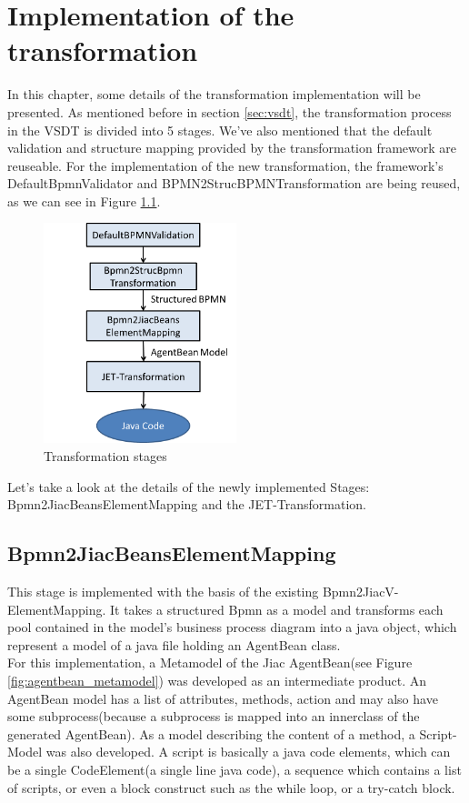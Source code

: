 \chapter{Implementation of the transformation}
\label{chap:implementation}
In this chapter, some details of the transformation implementation will be presented. As mentioned before in section \ref{sec:vsdt}, the transformation process in the VSDT is divided into 5 stages. We've also mentioned that the default validation and structure mapping provided by the transformation framework are reuseable. For the implementation of the new transformation, the framework's DefaultBpmnValidator and BPMN2StrucBPMNTransformation are being reused, as we can see in Figure \ref{fig:implementation_stages}.

\begin{figure}[h]
	\centering		\includegraphics[width=0.5\textwidth]{images/implementation_stages.png}
	\caption{Transformation stages}
	\label{fig:implementation_stages}
\end{figure}

Let's take a look at the details of the newly implemented Stages: Bpmn2JiacBeansElementMapping and the JET-Transformation.

\section{Bpmn2JiacBeansElementMapping}
This stage is implemented with the basis of the existing Bpmn2JiacV- ElementMapping. It takes a structured Bpmn as a model and transforms each pool contained in the model's business process diagram into a java object, which represent a model of a java file holding an AgentBean class.\\ For this implementation, a Metamodel of the Jiac AgentBean(see Figure \ref{fig:agentbean_metamodel}) was developed as an intermediate product. An AgentBean model has a list of attributes, methods, action and may also have some subprocess(because a subprocess is mapped into an innerclass of the generated AgentBean). As a model describing the content of a method, a Script-Model was also developed. A script is basically a java code elements, which can be a single CodeElement(a single line java code), a sequence which contains a list of scripts, or even a block construct such as the while loop, or a try-catch block. 

